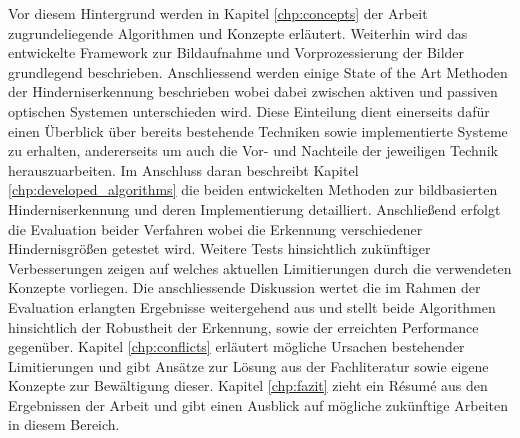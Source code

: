 \noindent
Vor diesem Hintergrund werden in Kapitel \ref{chp:concepts} der Arbeit zugrundeliegende Algorithmen und Konzepte erläutert. Weiterhin wird das entwickelte Framework zur Bildaufnahme und Vorprozessierung der Bilder grundlegend beschrieben. Anschliessend werden einige State of the Art Methoden der Hinderniserkennung beschrieben wobei dabei zwischen aktiven und passiven optischen Systemen unterschieden wird. Diese Einteilung dient einerseits dafür einen Überblick über bereits bestehende Techniken sowie implementierte Systeme zu erhalten, andererseits um auch die Vor- und Nachteile der jeweiligen Technik herauszuarbeiten. Im Anschluss daran beschreibt Kapitel \ref{chp:developed_algorithms} die beiden entwickelten Methoden zur bildbasierten Hinderniserkennung und deren Implementierung detailliert. Anschließend erfolgt die Evaluation beider Verfahren wobei die Erkennung verschiedener Hindernisgrößen getestet wird. Weitere Tests hinsichtlich zukünftiger Verbesserungen zeigen auf welches aktuellen Limitierungen durch die verwendeten Konzepte vorliegen. Die anschliessende Diskussion wertet die im Rahmen der Evaluation erlangten Ergebnisse weitergehend aus und stellt beide Algorithmen hinsichtlich der Robustheit der Erkennung, sowie der erreichten Performance gegenüber. Kapitel \ref{chp:conflicts} erläutert mögliche Ursachen bestehender Limitierungen und gibt Ansätze zur Lösung aus der Fachliteratur sowie eigene Konzepte zur Bewältigung dieser. Kapitel \ref{chp:fazit} zieht ein Ré­su­mé aus den Ergebnissen der Arbeit und gibt einen Ausblick auf mögliche zukünftige Arbeiten in diesem Bereich.